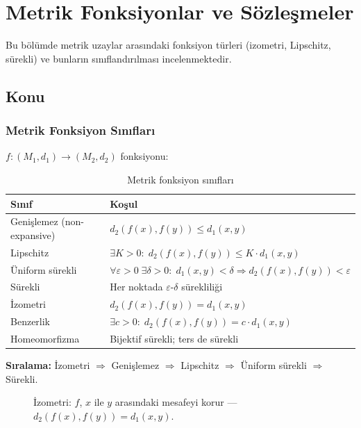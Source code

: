 \chapter{Metrik Fonksiyonlar ve Sözleşmeler}

Bu bölümde metrik uzaylar arasındaki fonksiyon türleri (izometri, Lipschitz, sürekli)
ve bunların sınıflandırılması incelenmektedir.

\section{Konu}

\subsection{Metrik Fonksiyon Sınıfları}

$f: (M_1, d_1) \to (M_2, d_2)$ fonksiyonu:

\begin{table}[h]
\centering
\begin{tabular}{ll}
\toprule
\textbf{Sınıf} & \textbf{Koşul} \\
\midrule
Genişlemez (non-expansive) & $d_2(f(x),f(y)) \leq d_1(x,y)$ \\
Lipschitz & $\exists K>0:\; d_2(f(x),f(y)) \leq K \cdot d_1(x,y)$ \\
Üniform sürekli & $\forall\varepsilon>0\;\exists\delta>0:\; d_1(x,y)<\delta \Rightarrow d_2(f(x),f(y))<\varepsilon$ \\
Sürekli & Her noktada $\varepsilon$-$\delta$ sürekliliği \\
İzometri & $d_2(f(x),f(y)) = d_1(x,y)$ \\
Benzerlik & $\exists c>0:\; d_2(f(x),f(y)) = c \cdot d_1(x,y)$ \\
Homeomorfizma & Bijektif sürekli; ters de sürekli \\
\bottomrule
\end{tabular}
\caption{Metrik fonksiyon sınıfları}
\end{table}

\textbf{Sıralama:} İzometri $\Rightarrow$ Genişlemez $\Rightarrow$ Lipschitz
$\Rightarrow$ Üniform sürekli $\Rightarrow$ Sürekli.

\begin{figure}[ht]
\centering

\caption{İzometri: $f$, $x$ ile $y$ arasındaki mesafeyi korur ---
         $d_2(f(x),f(y)) = d_1(x,y)$.}
\end{figure}

